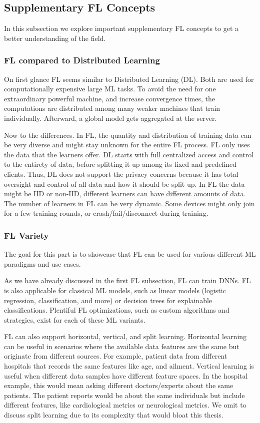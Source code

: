 \subsection{Supplementary FL Concepts}

In this subsection we explore important supplementary FL concepts
to get a better understanding of the field.

\subsubsection{FL compared to Distributed Learning}

On first glance FL seems similar to Distributed Learning (DL).
Both are used for computationally expensive large ML tasks.
To avoid the need for one extraordinary powerful machine,
and increase convergence times, 
the computations are distributed among many weaker machines that
train individually. Afterward, a global model gets aggregated
at the server.

Now to the differences.
In FL, the quantity and distribution of training data
can be very diverse and might stay unknown for the entire FL process.
FL only uses the data that the learners offer. 
DL starts with full centralized access and control to the entirety of data,
before splitting it up among its fixed and predefined clients.
Thus, DL does not support the privacy concerns because it has
total oversight and control of all data and how it should be split up.
In FL the data might be IID or non-IID, different learners can have
different amounts of data.
The number of learners in FL can be very dynamic.
Some devices might only join for a few training rounds,
or crash/fail/disconnect during training.

\subsubsection{FL Variety}

The goal for this part is to showcase that FL can
be used for various different ML paradigms and use cases.

As we have already discussed in the first FL subsection,
FL can train DNNs.
FL is also applicable for classical ML models, such as
linear models (logistic regression, classification, and more) or
decision trees for explainable classifications.
Plentiful FL optimizations, such as custom algorithms and strategies,
exist for each of these ML variants.

FL can also support horizontal, vertical, and split learning.
Horizontal learning can be useful in scenarios where the available data features are the same but
originate from different sources.
For example, patient data from different hospitals
that records the same features like age, and ailment.
Vertical learning is useful when different data samples have
different feature spaces.
In the hospital example, this would mean asking different doctors/experts
about the same patients. 
The patient reports would be about the same individuals but include different features,
like cardiological metrics or neurological metrics.
We omit to discuss split learning due to its complexity that would bloat this thesis.

